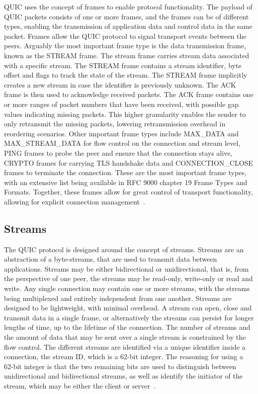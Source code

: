 \documentclass[english, 12pt, a4paper, elec, utf8, a-2b, online]{aaltothesis}
\begin{document}
QUIC uses the concept of frames to enable protocol functionality. The payload of
QUIC packets consists of one or more frames, and the frames can be of different types,
enabling the transmission of application data and control data in the same packet. Frames
allow the QUIC protocol to signal transport events between the peers. Arguably the most
important frame type is the data transmission frame, known as the STREAM frame. The stream frame
carries stream data associated with a specific stream. The STREAM frame contains
a stream identifier, byte offset and flags to track the state of the stream. The STREAM
frame implicitly creates a new stream in case the identifier is previously unknown.
The ACK frame is then used to acknowledge received packets. The ACK frame contains
one or more ranges of packet numbers that have been received, with possible gap values
indicating missing packets. This higher granularity enables the sender to only retransmit
the missing packets, lowering retransmission overhead in reordering scenarios. Other
important frame types include MAX\_DATA and MAX\_STREAM\_DATA for flow control
on the connection and stream level, PING frames to probe the peer and ensure that
the connection stays alive, CRYPTO frames for carrying TLS handshake data and CONNECTION\_CLOSE frames
to terminate the connection. These are the most important frame types, with an
extensive list being available in RFC 9000 chapter 19 Frame Types and Formats. Together,
these frames allow for great control of transport functionality, allowing for explicit
connection management~\cite{rfc9000}.

\subsection{Streams}

The QUIC protocol is designed around the concept of streams. Streams are an abstraction
of a byte-streams, that are used to transmit data between applications. Streams may
be either bidirectional or unidirectional, that is, from the perspective of one peer,
the streams may be read-only, write-only or read and write. Any single connection may contain one or
more streams, with the streams being multiplexed and entirely independent from one
another. Streams are designed to be lightweight, with minimal overhead. A stream can
open, close and transmit data in a single frame, or alternatively the streams
can persist for longer lengths of time, up to the lifetime of the connection. The number
of streams and the amount of data that may be sent over a single stream is constrained
by the flow control. The different streams are identified via a unique identifier inside a connection,
the stream ID, which is a 62-bit integer. The reasoning for using a 62-bit integer is
that the two remaining bits are used to distinguish between unidirectional and bidirectional
streams, as well as identify the initiator of the stream, which may be either the
client or server~\cite{rfc9000}.
\end{document}
